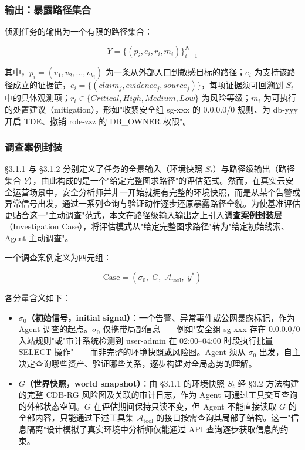 \documentclass[a4paper,12pt]{ctexart}
\begin{document}
\subsubsection{输出：暴露路径集合}

侦测任务的输出为一个有限的路径集合：

\[Y = \{(p_i, e_i, r_i, m_i)\}_{i=1}^{N}\]

其中，$p_i = (v_1, v_2, \ldots, v_{k_i})$ 为一条从外部入口到敏感目标的路径；$e_i$ 为支持该路径成立的证据链，$e_i = \{(claim_j, evidence_j, source_j)\}$，每项证据须可回溯到 $S_t$ 中的具体观测项；$r_i \in \{Critical, High, Medium, Low\}$ 为风险等级；$m_i$ 为可执行的处置建议（mitigation），形如"收紧安全组 sg-xxx 的 0.0.0.0/0 规则、为 db-yyy 开启 TDE、撤销 role-zzz 的 DB\_OWNER 权限"。

\subsubsection{调查案例封装}

§3.1.1 与 §3.1.2 分别定义了任务的全景输入（环境快照 $S_t$）与路径级输出（路径集合 $Y$），由此构成的是一个"给定完整图求路径"的评估范式。然而，在真实云安全运营场景中，安全分析师并非一开始就拥有完整的环境快照，而是从某个告警或异常信号出发，通过一系列查询与验证动作逐步还原暴露路径全貌。为使基准评估更贴合这一"主动调查"范式，本文在路径级输入输出之上引入\textbf{调查案例封装层}（Investigation Case），将评估模式从"给定完整图求路径"转为"给定初始线索、Agent 主动调查"。

一个调查案例定义为四元组：

\[\text{Case} = (\sigma_0,\; G,\; \mathcal{A}_{\text{tool}},\; y^*)\]

各分量含义如下：

\begin{itemize}[leftmargin=*]
\item \textbf{$\sigma_0$（初始信号，initial signal）}：一个告警、异常事件或公网暴露标记，作为 Agent 调查的起点。$\sigma_0$ 仅携带局部信息——例如"安全组 sg-xxx 存在 0.0.0.0/0 入站规则"或"审计系统检测到 user-admin 在 02:00–04:00 时段执行批量 SELECT 操作"——而非完整的环境快照或风险图。Agent 须从 $\sigma_0$ 出发，自主决定查询哪些资产、验证哪些关系，逐步构建对全局态势的理解。
\end{itemize}

\begin{itemize}[leftmargin=*]
\item \textbf{$G$（世界快照，world snapshot）}：由 §3.1.1 的环境快照 $S_t$ 经 §3.2 方法构建的完整 CDB-RG 风险图及关联的审计日志，作为 Agent 可通过工具交互查询的外部状态空间。$G$ 在评估期间保持只读不变，但 Agent 不能直接读取 $G$ 的全部内容，只能通过下述工具集 $\mathcal{A}_{\text{tool}}$ 的接口按需查询其局部子结构。这一"信息隔离"设计模拟了真实环境中分析师仅能通过 API 查询逐步获取信息的约束。
\end{itemize}
\end{document}
